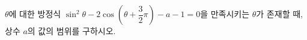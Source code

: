 $\theta$에 대한 방정식 $\sin^2\theta-2\cos\left(\theta+\dfrac{3}{2}\pi\right)-a-1=0$을 만족시키는 $\theta$가 존재할 때, 상수 $a$의 값의 범위를 구하시오.
